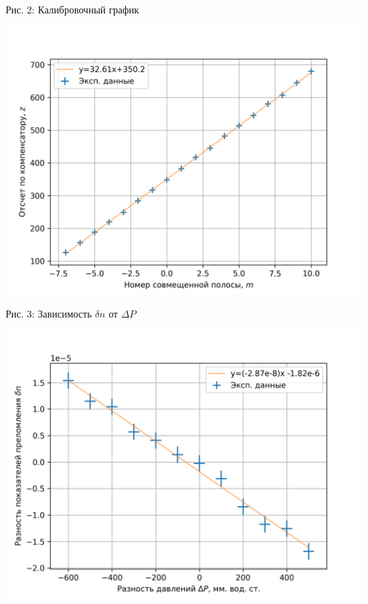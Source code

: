 \documentclass[12pt]{article}
\begin{document}
    \begin{minipage}[t]{0.5\linewidth}
        \centering
        \caption{Рис. 2: Калибровочный график}
        \includegraphics[width=\linewidth]{pic/3-5}
        \label{fig:fig2}
    \end{minipage}
    \hfill
    \begin{minipage}[t]{0.5\linewidth}
        \centering
        \caption{Рис. 3: Зависимость $\delta n$ от $\Delta P$}
        \includegraphics[width=\linewidth]{pic/6-7}
        \label{fig:fig3}
    \end{minipage}
    \vfill
\end{document}
